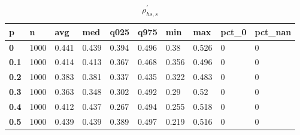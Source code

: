 \begin{table}[h]
 \centering 
\footnotesize
\caption{$\rho_{hs,s}^\prime $}
\label{tab:alphahss}
\begin{tabular}[h]{|l|l|l|l|l|l|l|l|l|l|
    } \hline
\textbf{ p} & \textbf{ n} & \textbf{ avg} & \textbf{ med} & \textbf{ q025} & \textbf{ q975} & \textbf{ min} & \textbf{ max} & \textbf{ pct\_0} & \textbf{ pct\_nan}
    \\ \hline
  \textbf{  0} & 1000 & 0.441 & 0.439 & 0.394 & 0.496 &  0.38 & 0.526 & 0 & 0
    \\ \hline
  \textbf{0.1} & 1000 & 0.414 & 0.413 & 0.367 & 0.468 & 0.356 & 0.496 & 0 & 0
    \\ \hline
  \textbf{0.2} & 1000 & 0.383 & 0.381 & 0.337 & 0.435 & 0.322 & 0.483 & 0 & 0
    \\ \hline
  \textbf{0.3} & 1000 & 0.363 & 0.348 & 0.302 & 0.492 &  0.29 &  0.52 & 0 & 0
    \\ \hline
  \textbf{0.4} & 1000 & 0.412 & 0.437 & 0.267 & 0.494 & 0.255 & 0.518 & 0 & 0
    \\ \hline
  \textbf{0.5} & 1000 & 0.439 & 0.439 & 0.389 & 0.497 & 0.219 & 0.516 & 0 & 0
    \\ \hline
 \end{tabular}
 \end{table}
